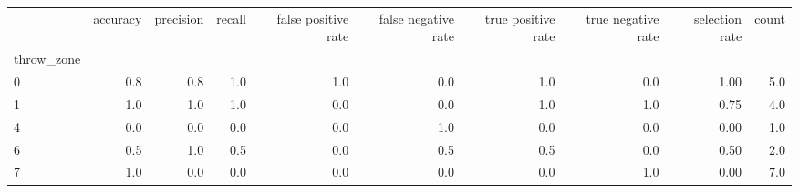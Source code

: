 \begin{tabular}{lrrrrrrrrr}
\toprule
{} &  accuracy &  precision &  recall &  false positive rate &  false negative rate &  true positive rate &  true negative rate &  selection rate &  count \\
throw\_zone &           &            &         &                      &                      &                     &                     &                 &        \\
\midrule
0          &       0.8 &        0.8 &     1.0 &                  1.0 &                  0.0 &                 1.0 &                 0.0 &            1.00 &    5.0 \\
1          &       1.0 &        1.0 &     1.0 &                  0.0 &                  0.0 &                 1.0 &                 1.0 &            0.75 &    4.0 \\
4          &       0.0 &        0.0 &     0.0 &                  0.0 &                  1.0 &                 0.0 &                 0.0 &            0.00 &    1.0 \\
6          &       0.5 &        1.0 &     0.5 &                  0.0 &                  0.5 &                 0.5 &                 0.0 &            0.50 &    2.0 \\
7          &       1.0 &        0.0 &     0.0 &                  0.0 &                  0.0 &                 0.0 &                 1.0 &            0.00 &    7.0 \\
\bottomrule
\end{tabular}
